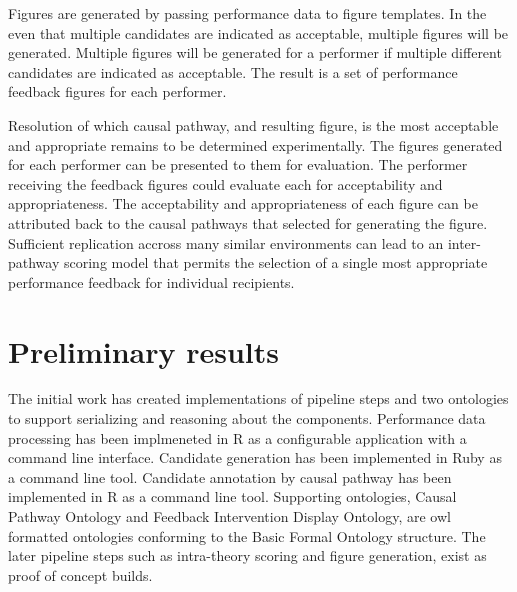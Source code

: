 \documentclass{amia}
\begin{document}
Figures are generated by passing performance data to figure templates.
In the even that multiple candidates are indicated as acceptable, multiple figures will be generated.
Multiple figures will be generated for a performer if multiple different candidates are indicated as acceptable.
The result is a set of performance feedback figures for each performer.

Resolution of which causal pathway, and resulting figure, is the most acceptable and appropriate remains to be determined experimentally.
The figures generated for each performer can be presented to them for evaluation.
The performer receiving the feedback figures could evaluate each for acceptability and appropriateness.
The acceptability and appropriateness of each figure can be attributed back to the causal pathways that selected for generating the figure.
Sufficient replication accross many similar environments can lead to an inter-pathway scoring model that permits the selection of a single most appropriate performance feedback for individual recipients.

\section*{Preliminary results}

The initial work has created implementations of pipeline steps and two ontologies to support serializing and reasoning about the components.
Performance data processing has been implmeneted in R\cite{rcoreteam2018} as a configurable application\cite{bitstomach2018} with a command line interface.
Candidate generation has been implemented in Ruby as a command line tool\cite{cansmash2018}.
Candidate annotation by causal pathway has been implemented in R as a command line tool\cite{thinkpudding2018}.
Supporting ontologies, Causal Pathway Ontology and Feedback Intervention Display Ontology, are owl formatted ontologies conforming to the Basic Formal Ontology structure.
The later pipeline steps such as intra-theory scoring and figure generation, exist as proof of concept builds.

\makeatletter
\renewcommand{\@biblabel}[1]{\hfill #1.}
\makeatother
\end{document}
